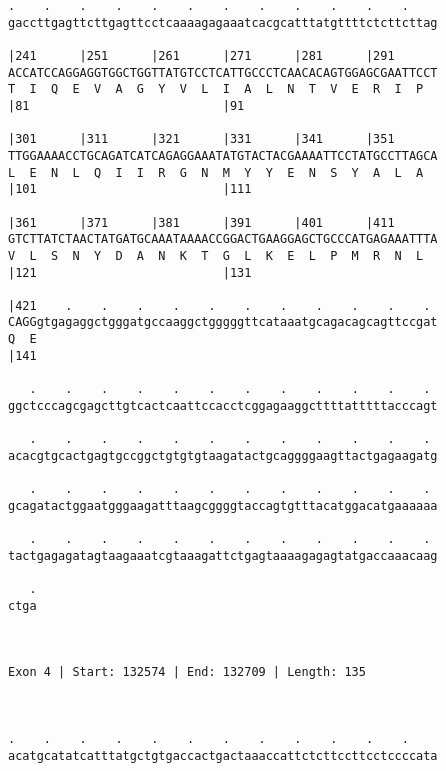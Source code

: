 \documentclass{article}
\begin{document}
\begin{Verbatim}
.    .    .    .    .    .    .    .    .    .    .    .    
gaccttgagttcttgagttcctcaaaagagaaatcacgcatttatgttttctcttcttag
                                                            
|241      |251      |261      |271      |281      |291      
ACCATCCAGGAGGTGGCTGGTTATGTCCTCATTGCCCTCAACACAGTGGAGCGAATTCCT
T  I  Q  E  V  A  G  Y  V  L  I  A  L  N  T  V  E  R  I  P  
|81                           |91                           
  
|301      |311      |321      |331      |341      |351      
TTGGAAAACCTGCAGATCATCAGAGGAAATATGTACTACGAAAATTCCTATGCCTTAGCA
L  E  N  L  Q  I  I  R  G  N  M  Y  Y  E  N  S  Y  A  L  A  
|101                          |111                          
  
|361      |371      |381      |391      |401      |411      
GTCTTATCTAACTATGATGCAAATAAAACCGGACTGAAGGAGCTGCCCATGAGAAATTTA
V  L  S  N  Y  D  A  N  K  T  G  L  K  E  L  P  M  R  N  L  
|121                          |131                          
  
|421    .    .    .    .    .    .    .    .    .    .    . 
CAGGgtgagaggctgggatgccaaggctgggggttcataaatgcagacagcagttccgat
Q  E                                                        
|141                                                        
  
   .    .    .    .    .    .    .    .    .    .    .    . 
ggctcccagcgagcttgtcactcaattccacctcggagaaggcttttatttttacccagt
                                                            
   .    .    .    .    .    .    .    .    .    .    .    . 
acacgtgcactgagtgccggctgtgtgtaagatactgcaggggaagttactgagaagatg
                                                            
   .    .    .    .    .    .    .    .    .    .    .    . 
gcagatactggaatgggaagatttaagcggggtaccagtgtttacatggacatgaaaaaa
                                                            
   .    .    .    .    .    .    .    .    .    .    .    . 
tactgagagatagtaagaaatcgtaaagattctgagtaaaagagagtatgaccaaacaag
                                                            
   .
ctga
    
    
 
Exon 4 | Start: 132574 | End: 132709 | Length: 135



.    .    .    .    .    .    .    .    .    .    .    .    
acatgcatatcatttatgctgtgaccactgactaaaccattctcttccttcctccccata
                                                            

\end{Verbatim}
\end{document}
